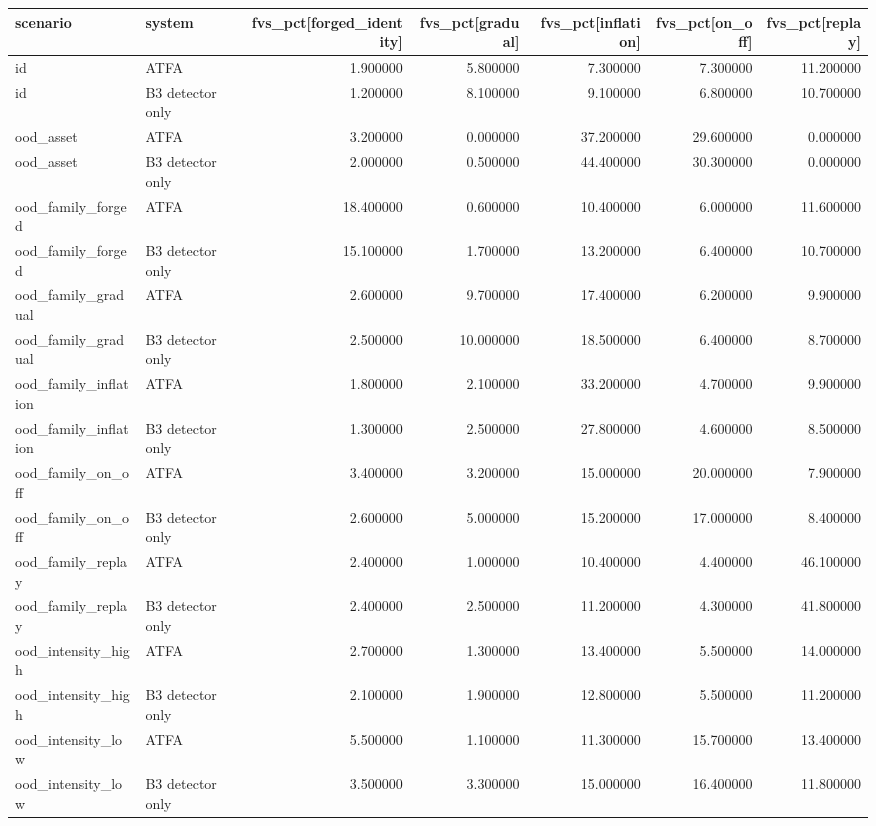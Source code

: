 \begin{tabular}{llrrrrr}
\toprule
scenario & system & fvs\_pct[forged\_identity] & fvs\_pct[gradual] & fvs\_pct[inflation] & fvs\_pct[on\_off] & fvs\_pct[replay] \\
\midrule
id & ATFA & 1.900000 & 5.800000 & 7.300000 & 7.300000 & 11.200000 \\
id & B3 detector only & 1.200000 & 8.100000 & 9.100000 & 6.800000 & 10.700000 \\
ood\_asset & ATFA & 3.200000 & 0.000000 & 37.200000 & 29.600000 & 0.000000 \\
ood\_asset & B3 detector only & 2.000000 & 0.500000 & 44.400000 & 30.300000 & 0.000000 \\
ood\_family\_forged & ATFA & 18.400000 & 0.600000 & 10.400000 & 6.000000 & 11.600000 \\
ood\_family\_forged & B3 detector only & 15.100000 & 1.700000 & 13.200000 & 6.400000 & 10.700000 \\
ood\_family\_gradual & ATFA & 2.600000 & 9.700000 & 17.400000 & 6.200000 & 9.900000 \\
ood\_family\_gradual & B3 detector only & 2.500000 & 10.000000 & 18.500000 & 6.400000 & 8.700000 \\
ood\_family\_inflation & ATFA & 1.800000 & 2.100000 & 33.200000 & 4.700000 & 9.900000 \\
ood\_family\_inflation & B3 detector only & 1.300000 & 2.500000 & 27.800000 & 4.600000 & 8.500000 \\
ood\_family\_on\_off & ATFA & 3.400000 & 3.200000 & 15.000000 & 20.000000 & 7.900000 \\
ood\_family\_on\_off & B3 detector only & 2.600000 & 5.000000 & 15.200000 & 17.000000 & 8.400000 \\
ood\_family\_replay & ATFA & 2.400000 & 1.000000 & 10.400000 & 4.400000 & 46.100000 \\
ood\_family\_replay & B3 detector only & 2.400000 & 2.500000 & 11.200000 & 4.300000 & 41.800000 \\
ood\_intensity\_high & ATFA & 2.700000 & 1.300000 & 13.400000 & 5.500000 & 14.000000 \\
ood\_intensity\_high & B3 detector only & 2.100000 & 1.900000 & 12.800000 & 5.500000 & 11.200000 \\
ood\_intensity\_low & ATFA & 5.500000 & 1.100000 & 11.300000 & 15.700000 & 13.400000 \\
ood\_intensity\_low & B3 detector only & 3.500000 & 3.300000 & 15.000000 & 16.400000 & 11.800000 \\
\bottomrule
\end{tabular}
